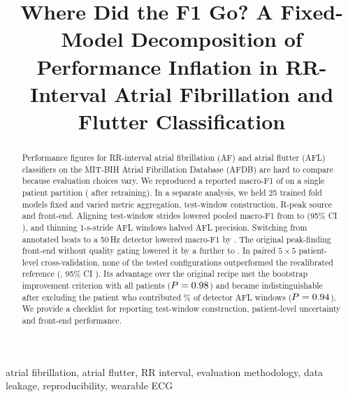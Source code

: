 \documentclass[conference,a4paper]{IEEEtran}
\begin{document}

\title{Where Did the F1 Go? A Fixed-Model Decomposition of Performance Inflation in RR-Interval Atrial Fibrillation and
Flutter Classification}

\ifblind
\author{
}
\else
\author{\IEEEauthorblockN{[Author 1], [Author 2], [Author 3], [Supervisor]}
}
\fi

\maketitle

\begin{abstract}
Performance figures for RR-interval atrial fibrillation (AF) and atrial flutter (AFL) classifiers on the MIT-BIH Atrial
Fibrillation Database (AFDB) are hard to compare because evaluation choices vary. We reproduced a reported macro-F1 of \mfA{}
on a single patient partition (\mfB{} after retraining). In a separate analysis, we held 25 trained fold models fixed and
varied metric aggregation, test-window construction, R-peak source and front-end. Aligning test-window strides lowered pooled
macro-F1 from \mfE{} to \mfG{} (95\% CI \ciG), and thinning 1-s-stride AFL windows halved AFL precision. Switching from annotated
beats to a 50\,Hz detector lowered macro-F1 by \adI. The original peak-finding front-end without quality gating lowered it by
a further \adJ{} to \mfJ. In paired $5\times5$ patient-level cross-validation, none of the tested configurations outperformed
the recalibrated reference (, 95\% CI ). Its advantage over the original recipe met the bootstrap improvement
criterion with all patients ($P=0.98$) and became indistinguishable after excluding the patient who contributed
\share\% of detector AFL windows ($P=0.94$). We provide a checklist for reporting test-window construction, patient-level
uncertainty and front-end performance.
\end{abstract}

\begin{IEEEkeywords}
atrial fibrillation, atrial flutter, RR interval, evaluation methodology, data leakage, reproducibility, wearable ECG
\end{IEEEkeywords}
\end{document}
